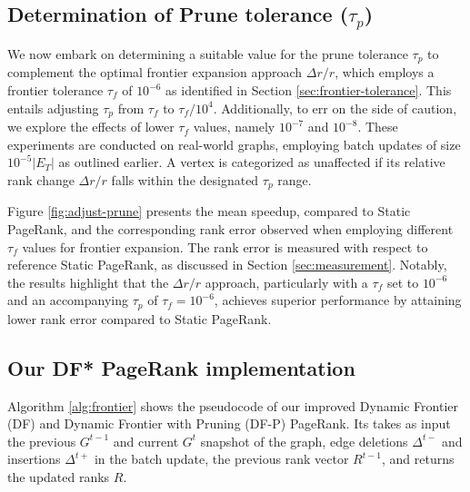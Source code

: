 






\subsection{Determination of Prune tolerance ($\tau_p$)}
\label{sec:prune-tolerance}

We now embark on determining a suitable value for the prune tolerance $\tau_p$ to complement the optimal frontier expansion approach $\Delta r/r$, which employs a frontier tolerance $\tau_f$ of $10^{-6}$ as identified in Section \ref{sec:frontier-tolerance}. This entails adjusting $\tau_p$ from $\tau_f$ to $\tau_f/10^4$. Additionally, to err on the side of caution, we explore the effects of lower $\tau_f$ values, namely $10^{-7}$ and $10^{-8}$. These experiments are conducted on real-world graphs, employing batch updates of size $10^{-5}|E_T|$ as outlined earlier. A vertex is categorized as unaffected if its relative rank change $\Delta r/r$ falls within the designated $\tau_p$ range.

Figure \ref{fig:adjust-prune} presents the mean speedup, compared to Static PageRank, and the corresponding rank error observed when employing different $\tau_f$ values for frontier expansion. The rank error is measured with respect to reference Static PageRank, as discussed in Section \ref{sec:measurement}. Notably, the results highlight that the $\Delta r/r$ approach, particularly with a $\tau_f$ set to $10^{-6}$ and an accompanying $\tau_p$ of $\tau_f = 10^{-6}$, achieves superior performance by attaining lower rank error compared to Static PageRank.



\subsection{Our DF* PageRank implementation}

Algorithm \ref{alg:frontier} shows the pseudocode of our improved Dynamic Frontier (DF) and Dynamic Frontier with Pruning (DF-P) PageRank. Its takes as input the previous $G^{t-1}$ and current $G^t$ snapshot of the graph, edge deletions $\Delta^{t-}$ and insertions $\Delta^{t+}$ in the batch update, the previous rank vector $R^{t-1}$, and returns the updated ranks $R$.

